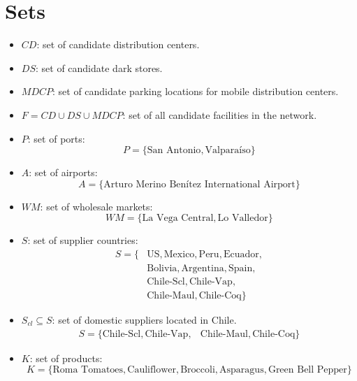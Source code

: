\documentclass[12pt]{article}
\begin{document}
\section{Sets}
\begin{itemize}
    \item $CD$: set of candidate distribution centers.
    
    \item $DS$: set of candidate dark stores.
    
    \item $MDCP$: set of candidate parking locations for mobile distribution centers.
    
    \item $F = CD \cup DS \cup MDCP$: set of all candidate facilities in the network.
    
    \item $P$: set of ports:
    \[
    P = \{\text{San Antonio}, \text{Valparaíso}\}
    \]
    
    \item $A$: set of airports:
    \[
    A = \{\text{Arturo Merino Benítez International Airport}\}
    \]
    
    \item $WM$: set of wholesale markets:
    \[
    WM = \{\text{La Vega Central}, \text{Lo Valledor}\}
    \]
    
    \item $S$: set of supplier countries:
    \[
    \begin{aligned}
    S = \{ & \mathrm{US}, \mathrm{Mexico}, \mathrm{Peru}, \mathrm{Ecuador}, \\
        & \mathrm{Bolivia}, \mathrm{Argentina}, \mathrm{Spain}, \\
        & \mathrm{Chile\text{-}Scl}, \mathrm{Chile\text{-}Vap}, \\
        & \mathrm{Chile\text{-}Maul}, \mathrm{Chile\text{-}Coq} \}
    \end{aligned}
    \]

    \item $S_{cl} \subseteq S$: set of domestic suppliers located in Chile.
     \[
    \begin{aligned}
    S = \{ \mathrm{Chile\text{-}Scl}, \mathrm{Chile\text{-}Vap}, 
        & \mathrm{Chile\text{-}Maul}, \mathrm{Chile\text{-}Coq} \}
    \end{aligned}
    \]



    \item $K$: set of products:
    \[
    K = \{\text{Roma Tomatoes}, \text{Cauliflower}, \text{Broccoli}, \text{Asparagus}, \text{Green Bell Pepper}\}
    \]
    

\end{itemize}
\end{document}
